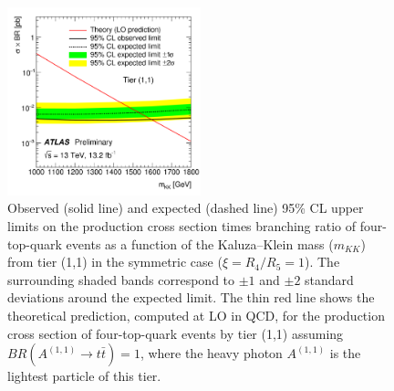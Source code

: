 \begin{figure}[t!]
 \centering
\includegraphics[width=0.5\textwidth]{figures/VLQ/fig_20.png}
\captionsetup{width=0.85\textwidth} \caption{\small Observed (solid line) and expected (dashed line) 95\% CL upper limits on the production cross section times branching ratio
of four-top-quark events as a function of the Kaluza--Klein mass ($m_{KK}$) from tier (1,1) in the symmetric case ($\xi=R_4/R_5=1$).
The surrounding shaded bands correspond to $\pm1$ and $\pm2$ standard deviations around the expected limit. 
The thin red line shows the theoretical prediction, computed at LO in QCD, for the production cross section of four-top-quark events 
by tier (1,1) assuming $BR(A^{(1,1)}\to t\bar{t})=1$, where the heavy photon $A^{(1,1)}$ is the lightest particle of this tier.}
\label{sec:vlq:fig:uedrpp}
\end{figure}

